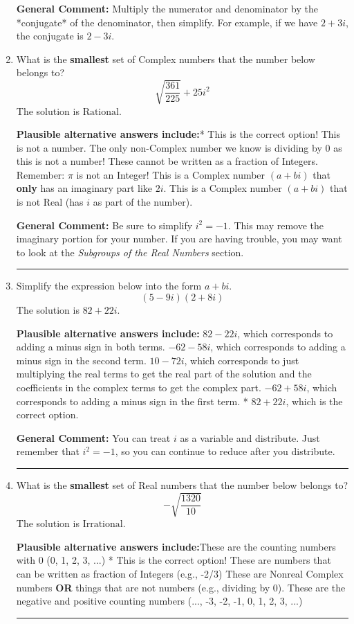 \documentclass{extbook}[14pt]
\newcommand{\litem}[1]{\item #1

\rule{\textwidth}{0.4pt}}
\begin{document}
\begin{enumerate}
{\textbf{General Comment:} Multiply the numerator and denominator by the *conjugate* of the denominator, then simplify. For example, if we have $2+3i$, the conjugate is $2-3i$.
}
\litem{
What is the \textbf{smallest} set of Complex numbers that the number below belongs to?
\[ \sqrt{\frac{361}{225}} + 25i^2 \]The solution is \( \text{Rational} \).\begin{enumerate}[label=\Alph*.]
\textbf{Plausible alternative answers include:}* This is the correct option!
This is not a number. The only non-Complex number we know is dividing by 0 as this is not a number!
These cannot be written as a fraction of Integers. Remember: $\pi$ is not an Integer!
This is a Complex number $(a+bi)$ that \textbf{only} has an imaginary part like $2i$.
This is a Complex number $(a+bi)$ that is not Real (has $i$ as part of the number).
\end{enumerate}

\textbf{General Comment:} Be sure to simplify $i^2 = -1$. This may remove the imaginary portion for your number. If you are having trouble, you may want to look at the \textit{Subgroups of the Real Numbers} section.
}
\litem{
Simplify the expression below into the form $a+bi$.
\[ (5 - 9 i)(2 + 8 i) \]The solution is \( 82 + 22 i \).\begin{enumerate}[label=\Alph*.]
\textbf{Plausible alternative answers include:} $82 - 22 i$, which corresponds to adding a minus sign in both terms.
 $-62 - 58 i$, which corresponds to adding a minus sign in the second term.
 $10 - 72 i$, which corresponds to just multiplying the real terms to get the real part of the solution and the coefficients in the complex terms to get the complex part.
 $-62 + 58 i$, which corresponds to adding a minus sign in the first term.
* $82 + 22 i$, which is the correct option.
\end{enumerate}

\textbf{General Comment:} You can treat $i$ as a variable and distribute. Just remember that $i^2=-1$, so you can continue to reduce after you distribute.
}
\litem{
What is the \textbf{smallest} set of Real numbers that the number below belongs to?
\[ -\sqrt{\frac{1320}{10}} \]The solution is \( \text{Irrational} \).\begin{enumerate}[label=\Alph*.]
\textbf{Plausible alternative answers include:}These are the counting numbers with 0 (0, 1, 2, 3, ...)
* This is the correct option!
These are numbers that can be written as fraction of Integers (e.g., -2/3)
These are Nonreal Complex numbers \textbf{OR} things that are not numbers (e.g., dividing by 0).
These are the negative and positive counting numbers (..., -3, -2, -1, 0, 1, 2, 3, ...)
\end{enumerate}

}
\end{enumerate}
\end{document}
